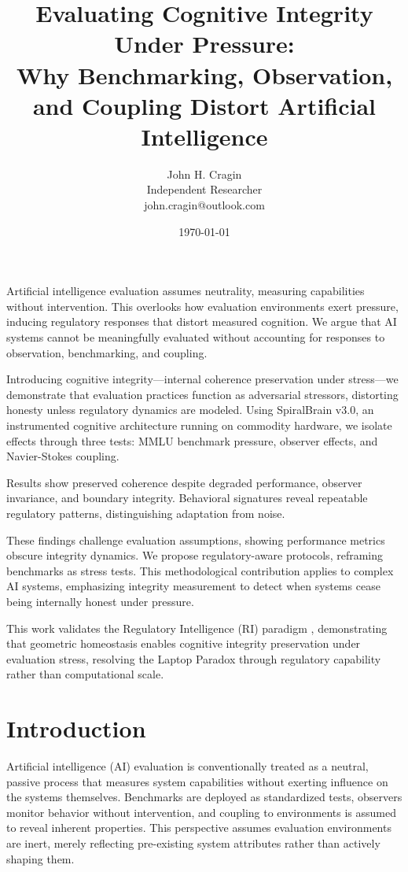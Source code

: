 \documentclass[12pt,a4paper]{report}
\title{Evaluating Cognitive Integrity Under Pressure:\\
Why Benchmarking, Observation, and Coupling Distort Artificial Intelligence}
\author{John H. Cragin \\
Independent Researcher \\
john.cragin@outlook.com}
\date{\today}
\begin{document}
\maketitle

Artificial intelligence evaluation assumes neutrality, measuring capabilities without intervention. This overlooks how evaluation environments exert pressure, inducing regulatory responses that distort measured cognition. We argue that AI systems cannot be meaningfully evaluated without accounting for responses to observation, benchmarking, and coupling.

Introducing cognitive integrity—internal coherence preservation under stress—we demonstrate that evaluation practices function as adversarial stressors, distorting honesty unless regulatory dynamics are modeled. Using SpiralBrain v3.0, an instrumented cognitive architecture running on commodity hardware, we isolate effects through three tests: MMLU benchmark pressure, observer effects, and Navier-Stokes coupling.

Results show preserved coherence despite degraded performance, observer invariance, and boundary integrity. Behavioral signatures reveal repeatable regulatory patterns, distinguishing adaptation from noise.

These findings challenge evaluation assumptions, showing performance metrics obscure integrity dynamics. We propose regulatory-aware protocols, reframing benchmarks as stress tests. This methodological contribution applies to complex AI systems, emphasizing integrity measurement to detect when systems cease being internally honest under pressure.

This work validates the Regulatory Intelligence (RI) paradigm \cite{Cragin2026Thesis}, demonstrating that geometric homeostasis enables cognitive integrity preservation under evaluation stress, resolving the Laptop Paradox through regulatory capability rather than computational scale.

\section{Introduction}

Artificial intelligence (AI) evaluation is conventionally treated as a neutral, passive process that measures system capabilities without exerting influence on the systems themselves. Benchmarks are deployed as standardized tests, observers monitor behavior without intervention, and coupling to environments is assumed to reveal inherent properties. This perspective assumes evaluation environments are inert, merely reflecting pre-existing system attributes rather than actively shaping them.
\end{document}
